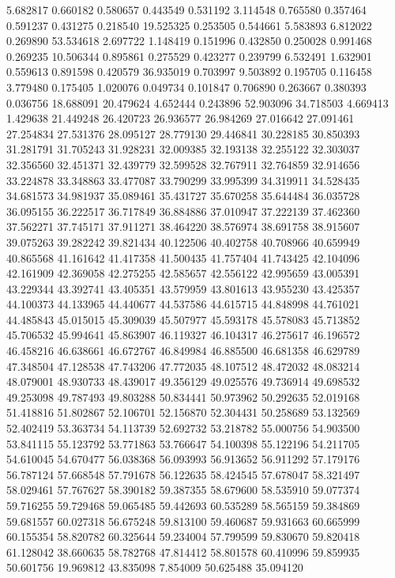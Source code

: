 5.682817
0.660182
0.580657
0.443549
0.531192
3.114548
0.765580
0.357464
0.591237
0.431275
0.218540
19.525325
0.253505
0.544661
5.583893
6.812022
0.269890
53.534618
2.697722
1.148419
0.151996
0.432850
0.250028
0.991468
0.269235
10.506344
0.895861
0.275529
0.423277
0.239799
6.532491
1.632901
0.559613
0.891598
0.420579
36.935019
0.703997
9.503892
0.195705
0.116458
3.779480
0.175405
1.020076
0.049734
0.101847
0.706890
0.263667
0.380393
0.036756
18.688091
20.479624
4.652444
0.243896
52.903096
34.718503
4.669413
1.429638
21.449248
26.420723
26.936577
26.984269
27.016642
27.091461
27.254834
27.531376
28.095127
28.779130
29.446841
30.228185
30.850393
31.281791
31.705243
31.928231
32.009385
32.193138
32.255122
32.303037
32.356560
32.451371
32.439779
32.599528
32.767911
32.764859
32.914656
33.224878
33.348863
33.477087
33.790299
33.995399
34.319911
34.528435
34.681573
34.981937
35.089461
35.431727
35.670258
35.644484
36.035728
36.095155
36.222517
36.717849
36.884886
37.010947
37.222139
37.462360
37.562271
37.745171
37.911271
38.464220
38.576974
38.691758
38.915607
39.075263
39.282242
39.821434
40.122506
40.402758
40.708966
40.659949
40.865568
41.161642
41.417358
41.500435
41.757404
41.743425
42.104096
42.161909
42.369058
42.275255
42.585657
42.556122
42.995659
43.005391
43.229344
43.392741
43.405351
43.579959
43.801613
43.955230
43.425357
44.100373
44.133965
44.440677
44.537586
44.615715
44.848998
44.761021
44.485843
45.015015
45.309039
45.507977
45.593178
45.578083
45.713852
45.706532
45.994641
45.863907
46.119327
46.104317
46.275617
46.196572
46.458216
46.638661
46.672767
46.849984
46.885500
46.681358
46.629789
47.348504
47.128538
47.743206
47.772035
48.107512
48.472032
48.083214
48.079001
48.930733
48.439017
49.356129
49.025576
49.736914
49.698532
49.253098
49.787493
49.803288
50.834441
50.973962
50.292635
52.019168
51.418816
51.802867
52.106701
52.156870
52.304431
50.258689
53.132569
52.402419
53.363734
54.113739
52.692732
53.218782
55.000756
54.903500
53.841115
55.123792
53.771863
53.766647
54.100398
55.122196
54.211705
54.610045
54.670477
56.038368
56.093993
56.913652
56.911292
57.179176
56.787124
57.668548
57.791678
56.122635
58.424545
57.678047
58.321497
58.029461
57.767627
58.390182
59.387355
58.679600
58.535910
59.077374
59.716255
59.729468
59.065485
59.442693
60.535289
58.565159
59.384869
59.681557
60.027318
56.675248
59.813100
59.460687
59.931663
60.665999
60.155354
58.820782
60.325644
59.234004
57.799599
59.830670
59.820418
61.128042
38.660635
58.782768
47.814412
58.801578
60.410996
59.859935
50.601756
19.969812
43.835098
7.854009
50.625488
35.094120
